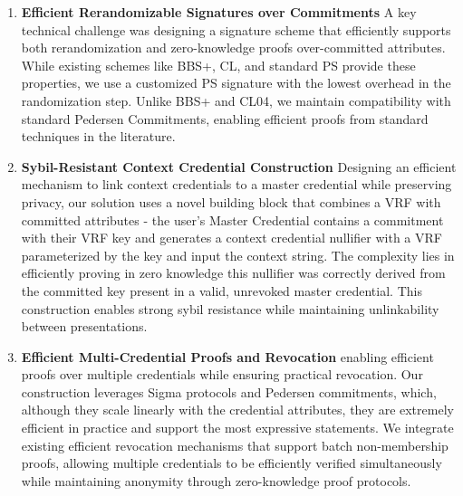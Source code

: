 
\begin{enumerate}

    \item \textbf{Efficient Rerandomizable Signatures over Commitments} A key technical challenge was designing a signature scheme that efficiently supports both rerandomization and zero-knowledge proofs over-committed attributes. While existing schemes like BBS+, CL, and standard PS provide these properties, we use a customized PS signature with the lowest overhead in the randomization step. %
    Unlike BBS+ and CL04, we maintain compatibility with standard Pedersen Commitments, enabling efficient proofs from standard techniques in the literature.
    

    \item \textbf{Sybil-Resistant Context Credential Construction} Designing an efficient mechanism to link context credentials to a master credential while preserving privacy, our solution uses a novel building block that combines a VRF with committed attributes - the user's Master Credential contains a commitment with their VRF key and generates a context credential nullifier with a VRF parameterized by the key and input the context string. 
    The complexity lies in efficiently proving in zero knowledge this nullifier was correctly derived from the committed key present in a valid, unrevoked master credential. This construction enables strong sybil resistance while maintaining unlinkability between presentations.

    \item \textbf{Efficient Multi-Credential Proofs and Revocation} enabling efficient proofs over multiple credentials while ensuring practical revocation. Our construction leverages Sigma protocols and Pedersen commitments, which, although they scale linearly with the credential attributes, they are extremely efficient in practice and support the most expressive statements. We integrate existing efficient revocation mechanisms that support batch non-membership proofs, allowing multiple credentials to be efficiently verified simultaneously while maintaining anonymity through zero-knowledge proof protocols. 

\end{enumerate}


